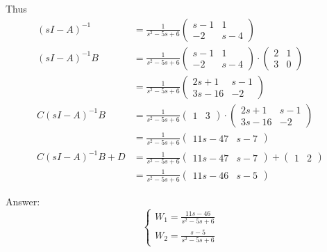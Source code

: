 \documentclass[12pt,letterpaper]{article}
\begin{document}
Thus
 \begin{align*}
    (sI - A)^{-1} &= \frac{1}{s^2-5s+6} \left( \begin{matrix} s-1 & 1 \\ -2 & s-4 \end{matrix} \right) \\
    (sI - A)^{-1}B &= \frac{1}{s^2-5s+6} \left( \begin{matrix} s-1 & 1 \\ -2 & s-4 \end{matrix} \right) \cdot \left( \begin{matrix} 2 & 1 \\ 3 & 0 \end{matrix} \right) \\
    &= \frac{1}{s^2-5s+6} \left( \begin{matrix} 2s+1 & s-1 \\ 3s-16 & -2 \end{matrix} \right) \\
    C(sI - A)^{-1}B &= \frac{1}{s^2-5s+6} \left( \begin{matrix} 1 & 3 \end{matrix} \right) \cdot \left( \begin{matrix} 2s+1 & s-1 \\ 3s-16 & -2 \end{matrix} \right) \\
    &= \frac{1}{s^2-5s+6} \left( \begin{matrix} 11s - 47 & s-7 \end{matrix} \right) \\
    C(sI - A)^{-1}B + D &= \frac{1}{s^2-5s+6} \left( \begin{matrix} 11s - 47 & s-7 \end{matrix} \right) +   \left( \begin{matrix} 1 & 2 \end{matrix} \right)\\
    &= \frac{1}{s^2-5s+6} \left( \begin{matrix} 11s - 46 & s-5 \end{matrix} \right)
 \end{align*}
 
 Answer: 
\begin{equation*}
    \begin{cases}
        W_1 = \frac{11s-46}{s^2-5s+6} \\
        W_2 = \frac{s-5}{s^2-5s+6}
    \end{cases}
\end{equation*}
\end{document}
